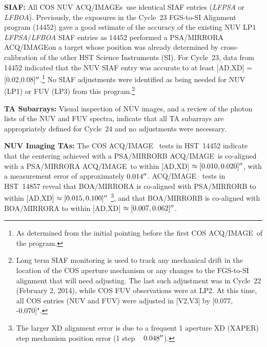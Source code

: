 \documentclass[12pt]{reportj}
\def\arcsec{\hbox{$^{\prime\prime}$}}
\newcommand*{\myfont}{\fontfamily{rm}\selectfont}
\def\acqimage{{\myfont ACQ/IMAGE}\rm}
\def\acqimages{{\myfont ACQ/IMAGE{\rm s}}\rm}
\begin{document}
\begin{description}
\item{\bf SIAF:}{
	All COS NUV \acqimages~use identical SIAF entries ({\it LFPSA} or {\it LFBOA}).
	Previously, the exposures in the Cycle~23 FGS-to-SI Alignment program (14452) gave a good estimate of the accuracy of the existing NUV LP1 {\it LFPSA}/{\it LFBOA} SIAF entries
	as 14452 performed a PSA/MIRRORA \acqimage on a target whose position was already determined by cross-calibration of the other HST Science Instruments (SI).
	For Cycle~23, data from 14452 indicated that the NUV SIAF entry was accurate to at least [AD,XD] = [0.02,0.08]$\arcsec$.\footnote{As determined from the initial pointing before the first COS \acqimage~of the program.}
	No SIAF adjustments were identified as being needed for NUV (LP1) or FUV (LP3) from this program.\footnote{Long term SIAF monitoring is used to track any mechanical drift in the location of the COS aperture mechanism or any changes to the FGS-to-SI alignment that will need adjusting.
	The last such adjustment was in Cycle~22 (February 2, 2014), while COS FUV observations were at LP2. At this time, all COS entries (NUV and FUV) were adjusted in [V2,V3] by [0.077, -0.070]". }
}
\item{\bf TA Subarrays:} Visual inspection of NUV images, and a review of the photon lists of the NUV and FUV spectra, indicate that all TA subarrays are appropriately defined for Cycle~24 and no adjustments were necessary.
\item{\bf NUV Imaging TAs:}
	The COS \acqimage~ tests in HST~14452 indicate that the centering achieved with a PSA/MIRRORB \acqimage~is co-aligned with a PSA/MIRRORA \acqimage~to within [AD,XD] $\approx [0.010,0.020]\arcsec$, with a measurement error of approximately $0.014\arcsec$.
	\acqimage~ tests in HST~14857 reveal that BOA/MIRRORA is co-aligned with PSA/MIRRORB to within [AD,XD] $\approx [0.015,0.100]\arcsec$
	\footnote{The larger XD alignment error is due to a frequent 1 aperture XD (XAPER) step mechanism position error (1 step ~ $0.048\arcsec$).}, and that BOA/MIRRORB is co-aligned with BOA/MIRRORA to within [AD,XD] $\approx [0.007,0.062]\arcsec$.


\end{description}
\end{document}
